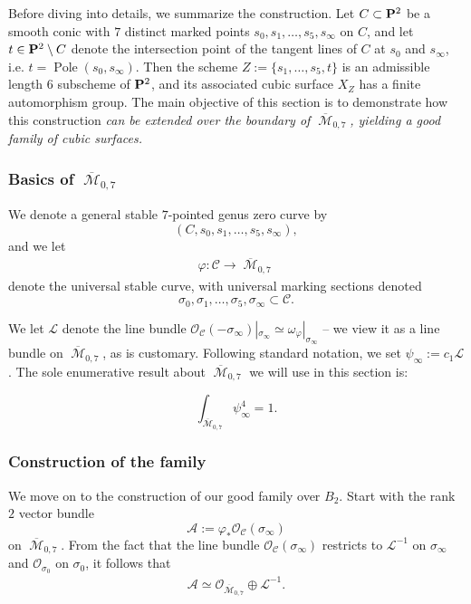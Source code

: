 \documentclass[12pt,reqno]{amsart}
\DeclareMathOperator{\Pole}{Pole}
\DeclareMathOperator{\M}{\mathcal{M}}
\renewcommand{\to}{{\longrightarrow}}
\numberwithin{equation}{section}
\renewcommand{\O}{\mathcal O}
\begin{document}
Before diving into details, we summarize the construction. Let
$C \subset \P^{2}$ be a smooth conic with $7$ distinct marked points
$s_{0}, s_{1}, \dots, s_{5}, s_{\infty}$ on $C$, and let
$t \in \P^{2} \setminus C$ denote the intersection point of the
tangent lines of $C$ at $s_{0}$ and $s_{\infty}$, i.e.
$t = \Pole(s_{0},s_{\infty})$.  Then the scheme
$Z := \{s_{1}, \dots , s_{5}, t \}$ is an admissible length $6$
subscheme of $\P^{2}$, and its associated cubic surface $X_{Z}$ has a
finite automorphism group.  The main objective of this section is to
demonstrate how this construction {\sl can be extended over the
  boundary of $\overline{\M}_{0,7}$, yielding a good family of cubic
  surfaces.}

\subsubsection{Basics of $\overline{\M}_{0,7}$}
\label{sec:basics-overlinem_0-7}

We denote a general stable $7$-pointed genus zero curve by
$$(C, s_{0}, s_{1}, \dots, s_{5}, s_{\infty}),$$
and we let 
\begin{align}
  \label{eq:PM07}
  \varphi: \mathcal{C} \to \overline{\M}_{0,7}
\end{align}
denote the universal stable curve, with universal marking sections
denoted $$\sigma_{0}, \sigma_{1}, \dots, \sigma_{5}, \sigma_{\infty} \subset \mathcal{C}.$$

We let $\mathcal{L}$ denote the line bundle
$\O_{\mathcal{C}}(-\sigma_{\infty})|_{\sigma_{\infty}} \simeq
\omega_{\varphi}|_{\sigma_{\infty}}$ -- we view it as a line bundle on
$\overline{\M}_{0,7}$, as is customary.  Following standard notation,
we set $\psi_{\infty} := c_{1}\mathcal{L}$.  The sole enumerative
result about $\overline{\M}_{0,7}$ we will use in this section is:

\begin{theorem}[ ???2 ]
  \label{theorem:psi}
  $$\int_{\overline{\M}_{0,7}} \psi_{\infty}^{4} = 1.$$
\end{theorem}

\subsubsection{Construction of the family}
\label{sec:construction-familyB2}


We move on to the construction of our good family over $B_2$. Start
with the rank $2$ vector bundle
$$\mathcal{A} := \varphi_{*}\O_{\mathcal{C}}(\sigma_{\infty})$$ on
$\overline{\M}_{0,7}$.  From the fact that the line bundle
$\O_{\mathcal{C}}(\sigma_{\infty})$ restricts to $\mathcal{L}^{-1}$ on
$\sigma_{\infty}$ and $\O_{\sigma_{0}}$ on $\sigma_{0}$, it follows
that
\begin{align*}
  \mathcal{A} \simeq \O_{\overline{\M}_{0,7}} \oplus \mathcal{L}^{-1}.
\end{align*}
\end{document}
